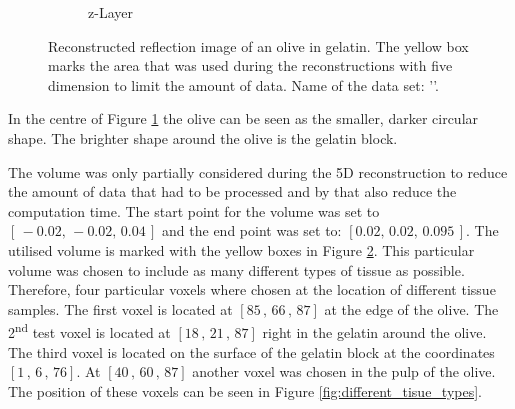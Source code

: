 \begin{figure}[H]
\begin{subfigure}[b]{0.55\textwidth}
         \caption{z-Layer}
         \label{fig:res:reflec_image_olive_xyz_z}
     \end{subfigure}
        \caption{Reconstructed reflection image of an olive in gelatin. The yellow box marks the area that was used during the reconstructions with five dimension to limit the amount of data.
        Name of the data set: ''.}
        \label{fig:res:reflec_image_olive_xyz}
\end{figure}


In the centre of Figure \ref{fig:res:reflec_image_olive_xyz_z} the olive can be seen as the smaller, darker circular shape. The brighter shape around the olive is the gelatin block. 

\bigskip


The volume was only partially considered during the 5D reconstruction to reduce the amount of data that had to be processed and by that also reduce the computation time. The start point for the volume was set to $[\, -0.02,\, -0.02,\, 0.04\, ]$ and the end point was set to: $[ 0.02,\, 0.02,\, 0.095\, ]$. The utilised volume is marked with the yellow boxes in Figure \ref{fig:res:reflec_image_olive_xyz}. This particular volume was chosen to include as many different types of tissue as possible. Therefore, four particular voxels where chosen at the location of different tissue samples. The first voxel is located at $[85\, , \, 66\, , \, 87]$ at the edge of the olive. The 2\textsuperscript{nd} test voxel is located at $[18\, , \, 21\, , \, 87]$ right in the gelatin around the olive. The third voxel is located on the surface of the gelatin block at the coordinates $[1\, , \, 6\, , \, 76]$. At $[40\, , \, 60\, , \, 87]$ another voxel was chosen in the pulp of the olive. The position of these voxels can be seen in Figure \ref{fig:different_tisue_types}.  
      
      
      
